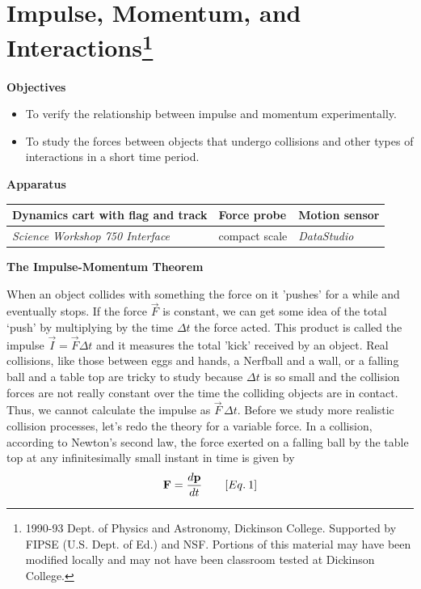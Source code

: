 
\section{Impulse, Momentum, and Interactions\footnote{
1990-93 Dept. of Physics and Astronomy, Dickinson College. Supported by FIPSE
(U.S. Dept. of Ed.) and NSF. Portions of this material may have been modified
locally and may not have been classroom tested at Dickinson College.
}}

\makelabheader %

\textbf{Objectives }

\begin{itemize}
\item To verify the relationship between impulse and momentum experimentally. 
\item To study the forces between objects that undergo collisions and other types of interactions in a short time period.
\end{itemize}
\textbf{Apparatus} 

\begin{center}
\begin{tabular}{|l|l|l|} \hline
Dynamics cart with flag and track   & Force probe   & Motion sensor \\ \hline
{\it Science Workshop 750 Interface}& compact scale & {\it DataStudio} \\ \hline
\end{tabular}
\end{center}

\textbf{The Impulse-Momentum Theorem }

When an object collides with something the force on it 'pushes' for a while and eventually
stops.
If the force $\vec F$ is constant, we can get some idea of the total `push' by multiplying by
the time $\Delta t$ the force acted.
This product is called the impulse $\vec I = \vec F \Delta t$ and it measures
the total 'kick' received by an object.
Real collisions, like those between eggs and hands, a Nerfball and a wall, or
a falling ball and a table top are tricky to study because $\Delta t$ 
is so small and
the collision forces are not really constant over the time the colliding objects
are in contact. Thus, we cannot calculate the impulse as $\vec F \,\Delta t$. 
Before we study
more realistic collision processes, let's redo the theory for a variable force.
In a collision, according to Newton's second law, the force exerted on a falling
ball by the table top at any infinitesimally small instant in time is given
by
\[
{\bf F}=\frac{d{\bf p}}{dt}\qquad [Eq.\: 1]\]



